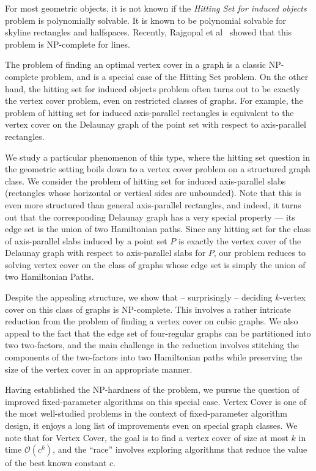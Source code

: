 \documentclass[svgnames]{llncs}
\newcommand{\NPC}{\textrm{\textup{NP-complete}}\xspace}
\newcommand{\OO}{{\mathcal O}}
\begin{document}
For most geometric objects, it is not known if the {\em Hitting Set for induced objects} problem
is polynomially solvable. It is known to be polynomial solvable for skyline rectangles and halfspaces.
Recently, Rajgopal et al~\cite{RAGKM13} showed that this problem is NP-complete for lines.

The problem of finding an optimal vertex cover in a graph is a classic NP-complete problem, and is a special case of the Hitting Set problem. 
On the other hand, the hitting set for induced objects problem often turns out to be exactly the vertex cover problem, even on
restricted classes of graphs. For example, the problem of hitting set for induced axis-parallel rectangles is equivalent to the vertex cover on the Delaunay graph of the point set with respect to axis-parallel rectangles.

We study a particular phenomenon of this type, where the hitting set question in the geometric setting boils down to a vertex cover problem on a structured graph
class. We consider the problem of hitting set for induced axis-parallel slabs (rectangles whose horizontal or vertical sides are unbounded). Note that
this is even more structured than general axis-parallel rectangles, and indeed, it turns out that the corresponding Delaunay graph has a very special property --- its edge set
is the union of two Hamiltonian paths. Since any hitting set for the class of axis-parallel slabs induced by a point set $P$ is exactly the vertex cover of the Delaunay graph
with respect to axis-parallel slabs for $P$, our problem reduces to solving vertex cover on the class of graphs whose edge set is simply the union of two Hamiltonian Paths.


Despite the appealing structure, we show that -- surprisingly -- deciding  $k$-vertex cover on this class of graphs is \NPC{}. This involves a rather intricate reduction from the problem of
finding a vertex cover on cubic graphs. We also appeal to the fact that the edge set of four-regular graphs can be partitioned into two two-factors, and the main challenge in the
reduction involves stitching the components of the two-factors into two Hamiltonian paths while preserving the size of the vertex cover in an appropriate manner.

Having established the NP-hardness of the problem, we pursue the question of improved fixed-parameter algorithms on this special case. Vertex Cover is one of the most well-studied
problems in the context of fixed-parameter algorithm design, it enjoys a long list of improvements even on special graph classes. We note that for {\sc Vertex Cover}, the
goal is to find a vertex cover of size at most $k$ in time $\OO(c^k)$, and the ``race'' involves exploring algorithms that reduce the value of the best known constant $c$.
\end{document}
